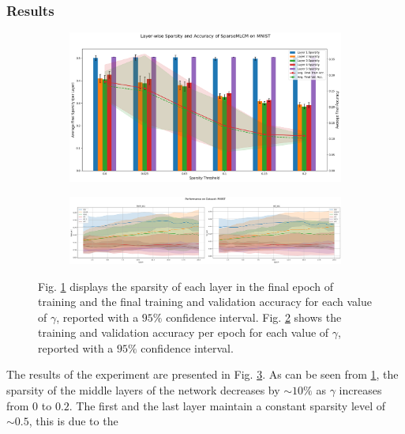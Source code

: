 \documentclass[a4paper,12pt]{report}
\begin{document}
\subsubsection*{Results}
\begin{figure}[h!]
    \centering
    \begin{subfigure}{\textwidth}
        \includegraphics[width=\linewidth]{pictures/mnist_exp2_1.png}
        \caption{}\label{fig:mnist_exp2_1}
    \end{subfigure}
    \hfill
    \begin{subfigure}{1\textwidth}
        \includegraphics[width=\linewidth]{pictures/mnist_accs_exp2_1.png}
        \caption{}\label{fig:mnist_accs_exp2_1}
    \end{subfigure}
    \caption{Fig. \ref{fig:mnist_exp2_1} displays the sparsity of each layer in the 
    final epoch of training and the final training and validation accuracy for each 
    value of $\gamma$, reported with a $95\%$ confidence interval.
    Fig. \ref{fig:mnist_accs_exp2_1} shows the training and validation accuracy per epoch
    for each value of $\gamma$, reported with a $95\%$ confidence interval.}
    \label{fig:exp2_1}
\end{figure}
The results of the experiment are presented in Fig. \ref{fig:exp2_1}. As can be seen 
from \ref{fig:mnist_exp2_1}, the sparsity of the middle layers of the network 
decreases by $\sim10\%$ as $\gamma$ increases from $0$ to $0.2$. The first and the 
last layer maintain a constant sparsity level of $\sim0.5$, this is due to the 
\end{document}
